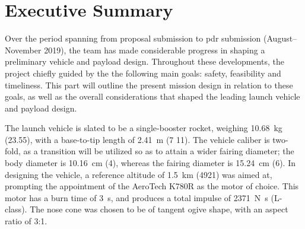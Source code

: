 \chapter{Executive Summary}

Over the period spanning from proposal submission to \gls{pdr} submission (August--November 2019), the team has made considerable progress in shaping a preliminary vehicle and payload design. Throughout these developments, the project chiefly guided by the the following main goals: safety, feasibility and timeliness. This part will outline the present mission design in relation to these goals, as well as the overall considerations that shaped the leading launch vehicle and payload design.

The launch vehicle is slated to be a single-booster rocket, weighing \SI{10.68}{\kilo\gram} (\SI{23.55}{\poundm}), with a base-to-tip length of \SI{2.41}{\meter} (\SI{7}{\feet} \SI{11}{\inch}). The vehicle caliber is two-fold, as a transition will be utilized so as to attain a wider fairing diameter; the body diameter is \SI{10.16}{\centi\meter} (\SI{4}{\inch}), whereas the fairing diameter is \SI{15.24}{\centi\meter} (\SI{6}{\inch}). In designing the vehicle, a reference altitude of \SI{1.5}{\kilo\meter} (\SI{4921}{\feet}) was aimed at, prompting the appointment of the AeroTech K780R as the motor of choice. This motor has a burn time of \SI{3}{\second}, and produces a total impulse of \SI{2371}{\newton\second} (L-class). The nose cone was chosen to be of tangent ogive shape, with an aspect ratio of 3:1.